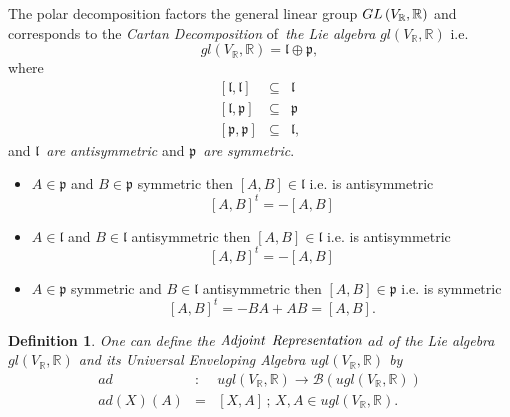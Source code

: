 \documentclass[aps,preprint]{revtex4}
\newtheorem{definition}[theorem]{Definition}
\begin{document}
The polar decomposition factors the general linear group $GL\left( V_{%
\mathbb{R}},\mathbb{R}\right) $ and corresponds to the \emph{Cartan
Decomposition }of\emph{\ the Lie algebra }$gl\left( V_{\mathbb{R}},\mathbb{R}%
\right) $ i.e. 
\begin{equation}
gl\left( V_{\mathbb{R}},\mathbb{R}\right) =\mathfrak{l}\oplus \mathfrak{p,}
\end{equation}%
where 
\begin{eqnarray}
\left[ \mathfrak{l,l}\right] &\subseteq &\mathfrak{l} \\
\left[ \mathfrak{l,p}\right] &\subseteq &\mathfrak{p} \\
\left[ \mathfrak{p,p}\right] &\subseteq &\mathfrak{l,}
\end{eqnarray}%
and $\mathfrak{l}$\emph{\ are antisymmetric} and $\mathfrak{p}$\emph{\ are
symmetric}.

\begin{itemize}
\item $A\in \mathfrak{p}$ and $B\in \mathfrak{p}$ symmetric then $\left[ A,B%
\right] \in \mathfrak{l}$ i.e. is antisymmetric%
\begin{equation}
\left[ A,B\right] ^{t}=-\left[ A,B\right]
\end{equation}

\item $A\in \mathfrak{l}$ and $B\in \mathfrak{l}$ antisymmetric then $\left[
A,B\right] \in \mathfrak{l}$ i.e. is antisymmetric%
\begin{equation}
\left[ A,B\right] ^{t}=-\left[ A,B\right]
\end{equation}

\item $A\in \mathfrak{p}$ symmetric and $B\in \mathfrak{l}$ antisymmetric
then $\left[ A,B\right] \in \mathfrak{p}$ i.e. is symmetric%
\begin{equation}
\left[ A,B\right] ^{t}=-BA+AB=\left[ A,B\right] .
\end{equation}
\end{itemize}

\begin{definition}
One can define the $\emph{Adjoint}$ $\emph{Representation}$ $ad$ of the Lie
algebra $gl\left( V_{\mathbb{R}},\mathbb{R}\right) $ and its \emph{Universal
Enveloping Algebra} $ugl\left( V_{\mathbb{R}},\mathbb{R}\right) $ by 
\begin{eqnarray}
ad &:&ugl\left( V_{\mathbb{R}},\mathbb{R}\right) \rightarrow \mathcal{B}%
\left( ugl\left( V_{\mathbb{R}},\mathbb{R}\right) \right) \\
ad\left( X\right) \left( A\right) &=&\left[ X,A\right] \,;\,X,A\in ugl\left(
V_{\mathbb{R}},\mathbb{R}\right) .
\end{eqnarray}
\end{definition}
\end{document}
